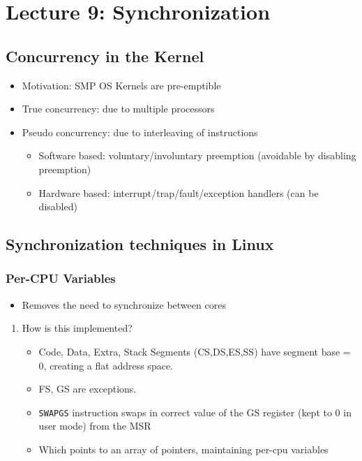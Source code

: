 \documentclass[11pt]{article}
\begin{document}
\section{Lecture 9: Synchronization}
\label{sec:org1b6265b}
\subsection{Concurrency in the Kernel}
\label{sec:orge45f899}
\begin{itemize}
\item Motivation: SMP OS Kernels are pre-emptible
\item True concurrency: due to multiple processors
\item Pseudo concurrency: due to interleaving of instructions
\begin{itemize}
\item Software based: voluntary/involuntary preemption (avoidable by disabling
preemption)
\item Hardware based: interrupt/trap/fault/exception handlers (can be disabled)
\end{itemize}
\end{itemize}
\subsection{Synchronization techniques in Linux}
\label{sec:org273aad3}
\subsubsection{Per-CPU Variables}
\label{sec:org59e40b7}
\begin{itemize}
\item Removes the need to synchronize between cores
\end{itemize}
\begin{enumerate}
\item How is this implemented?
\label{sec:orgf7fc9c5}
\begin{itemize}
\item Code, Data, Extra, Stack Segments (CS,DS,ES,SS) have segment base = 0,
creating a flat address space.
\item FS, GS are exceptions.
\item \texttt{SWAPGS} instruction swaps in correct value of the GS register (kept to 0 in
user mode) from the MSR
\item Which points to an array of pointers, maintaining per-cpu variables
\end{itemize}
\end{enumerate}
\end{document}
